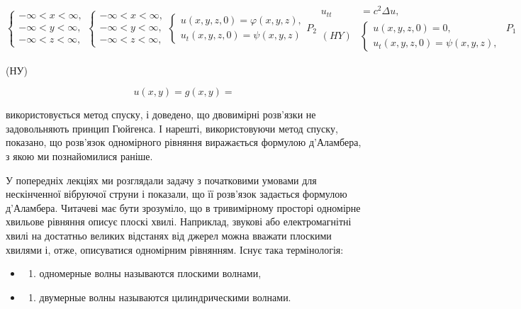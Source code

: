 \documentclass[
  ukrainian,
]{article}
\providecommand{\tightlist}{%
  \setlength{\itemsep}{0pt}\setlength{\parskip}{0pt}}
\begin{document}
\[
\begin{cases} -\infty < x < \infty, \\ -\infty < y < \infty, \\ -\infty < z < \infty, \end{cases}
\begin{cases} -\infty < x < \infty, \\ -\infty < y < \infty, \\ -\infty < z < \infty, \end{cases}
\begin{cases} u(x, y, z, 0) = \varphi(x, y, z), \\ u_{t}(x, y, z, 0) = \psi(x, y, z) \end{cases}
P_{2}
\begin{aligned} u_{tt} &= c^2 \Delta u, \\ (HY) & \begin{cases} u(x, y, z, 0) = 0, \\ u_t(x, y, z, 0) = \psi(x, y, z), \end{cases} \end{aligned}
P_{1}
\]

(НУ)

\[
u(x,y) = g(x,y) =
\]

використовується метод спуску, і доведено, що двовимірні розв'язки не
задовольняють принцип Гюйгенса. І нарешті, використовуючи метод спуску,
показано, що розв'язок одномірного рівняння виражається формулою
д'Аламбера, з якою ми познайомилися раніше.

У попередніх лекціях ми розглядали задачу з початковими умовами для
нескінченної вібруючої струни і показали, що її розв'язок задається
формулою д'Аламбера. Читачеві має бути зрозуміло, що в тривимірному
просторі одномірне хвильове рівняння описує плоскі хвилі. Наприклад,
звукові або електромагнітні хвилі на достатньо великих відстанях від
джерел можна вважати плоскими хвилями і, отже, описуватися одномірним
рівнянням. Існує така термінологія:

\begin{itemize}
\tightlist
\item
  \begin{enumerate}
  \def\labelenumi{\arabic{enumi})}
  \tightlist
  \item
    одномерные волны называются плоскими волнами,
  \end{enumerate}
\item
  \begin{enumerate}
  \def\labelenumi{\arabic{enumi})}
  \setcounter{enumi}{1}
  \tightlist
  \item
    двумерные волны называются цилиндрическими волнами.
  \end{enumerate}
\end{itemize}
\end{document}

